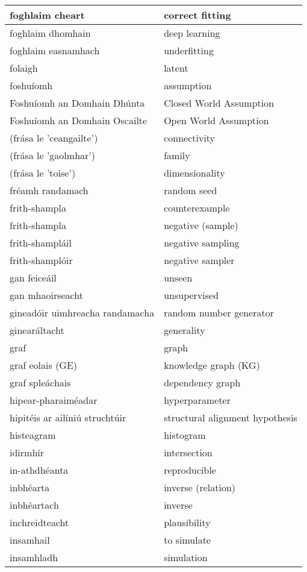 \documentclass{article}
\begin{document}
\begin{longtable}{|l|l|}
		foghlaim cheart&correct fitting\\ \hline 
		foghlaim dhomhain&deep learning\\ \hline 
		foghlaim easnamhach&underfitting\\ \hline 
		folaigh&latent\\ \hline 
		foshuíomh&assumption\\ \hline 
		Foshuíomh an Domhain Dhúnta&Closed World Assumption\\ \hline 
		Foshuíomh an Domhain Oscailte&Open World Assumption\\ \hline 
		(frása le 'ceangailte')&connectivity\\ \hline 
		(frása le 'gaolmhar')&family\\ \hline 
		(frása le 'toise')&dimensionality\\ \hline 
		fréamh randamach&random seed\\ \hline 
		frith-shampla&counterexample\\ \hline 
		frith-shampla&negative (sample)\\ \hline 
		frith-shampláil&negative sampling\\ \hline 
		frith-shamplóir&negative sampler\\ \hline 
		gan feiceáil&unseen\\ \hline 
		gan mhaoirseacht&unsupervised\\ \hline 
		gineadóir uimhreacha randamacha&random number generator\\ \hline 
		ginearáltacht&generality\\ \hline 
		graf&graph\\ \hline 
		graf eolais (GE)&knowledge graph (KG)\\ \hline 
		graf spleáchais&dependency graph\\ \hline 
		hipear-pharaiméadar&hyperparameter\\ \hline 
		hipitéis ar ailíniú struchtúir&structural alignment hypothesis\\ \hline 
		histeagram&histogram\\ \hline 
		idirmhír&intersection\\ \hline 
		in-athdhéanta&reproducible\\ \hline 
		inbhéarta&inverse (relation)\\ \hline 
		inbhéartach&inverse\\ \hline 
		inchreidteacht&plausibility\\ \hline 
		insamhail&to simulate\\ \hline 
		insamhladh&simulation\\ \hline 

\end{longtable}
\end{document}
